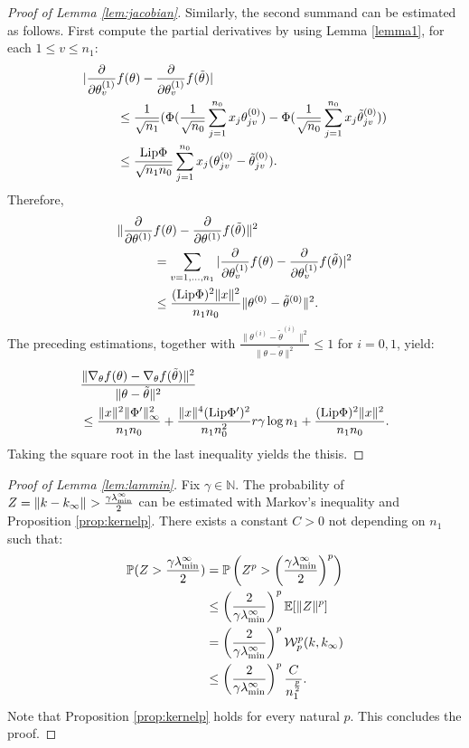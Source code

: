 \documentclass{article}
\theoremstyle{definition}
\theoremstyle{remark}
\numberwithin{equation}{section}
\newcommand{\N}{\mathbb{N}}
\newcommand{\E}{\mathbb{E}}
\newcommand{\lammin}{\lambda_{\textup{min}}}
\newcommand{\norm}[2]{
    \|#1\|_{#2}
}
\newcommand{\partv}[1]{
    \frac{\partial}{\partial #1}
}
\begin{document}
\begin{proof}[Proof of Lemma \ref{lem:jacobian}]
    Similarly, the second summand can be estimated as follows.
    First compute the partial derivatives by using Lemma \ref{lemma1}, for each $1 \le v \le n_1$:
    \begin{align}
        \vert \partv{\theta^{(1)}_v} &f(\theta )-\partv{\theta^{(1)}_v} f(\tilde \theta) \vert \\
        &\le \frac{1}{\sqrt{n_1}}(\Phi(\frac{1}{\sqrt{n_0}}\sum_{j=1}^{n_0}x_j\theta^{(0)}_{jv})-\Phi(\frac{1}{\sqrt{n_0}}\sum_{j=1}^{n_0}x_j\tilde \theta^{(0)}_{jv}))\\
        &\le \frac{\textup{Lip}\Phi}{\sqrt{n_1n_0}}\sum_{j=1}^{n_0}x_j(\theta^{(0)}_{jv}-\tilde \theta^{(0)}_{jv}).
    \end{align}
    Therefore,
    \begin{align}
        \norm{\partv{\theta^{(1)}} &f(\theta )-\partv{\theta^{(1)}} f(\tilde \theta)}{}^2 \\
        &= \sum_{v=1, \ldots, n_1}\vert \partv{\theta^{(1)}_{v}} f(\theta )-\partv{\theta^{(1)}_{v}} f(\tilde \theta) \vert^2 \\
        &\le \frac{(\textup{Lip}\Phi)^2 \norm{x}{}^2}{n_1n_0}\norm{\theta^{(0)}-\tilde\theta^{(0)}}{}^2.
    \end{align}
    The preceding estimations, together with $\frac{\norm{\theta^{(i)}-\tilde\theta^{(i)}}{}^2}{\norm{\theta - \tilde \theta}{}^2} \le 1$ for $i = 0,1$, yield:
    \begin{align}
        &\frac{\norm{\nabla_\theta f(\theta)-\nabla_\theta f(\tilde \theta)}{}^2}{\norm{\theta - \tilde \theta}{}^2} \\
        &\le \frac{\norm{x}{}^2\norm{\Phi'}{\infty}^2}{n_1n_0} + \frac{\norm{x}{}^4(\textup{Lip}\Phi')^2}{n_1n_0^2}r\gamma \log n_1 + \frac{(\textup{Lip}\Phi)^2 \norm{x}{}^2}{n_1n_0}.
    \end{align}
    Taking the square root in the last inequality yields the thisis.
\end{proof}
 
\begin{proof}[Proof of Lemma \ref{lem:lammin}]
    Fix $\gamma \in \N$.
    The probability of $Z= \norm{k-k_\infty}{} > \frac{\gamma \lammin^\infty}{2}$ can be estimated with Markov's inequality and Proposition \ref{prop:kernelp}.
    There exists a constant $C>0$ not depending on $n_1$ such that:
    \begin{align}
        \mathbb P(Z > \frac{\gamma\lammin^\infty}{2}) &= \mathbb P\left(Z^p > \left(\frac{\gamma\lammin^\infty}{2}\right)^p\right)\\
        &\le \left(\frac{2}{\gamma\lammin^\infty}\right)^p\E[\norm{Z}{}^p]\\
        &=\left(\frac{2}{\gamma \lammin^\infty}\right)^p\mathcal W^p_p(k,k_\infty) \\
        &\le \left(\frac{2}{\gamma \lammin^\infty}\right)^p\frac{C}{n_1^\frac{p}{2}}.
    \end{align}
    Note that Proposition \ref{prop:kernelp} holds for every natural $p$.
    This concludes the proof.
\end{proof}
\end{document}
